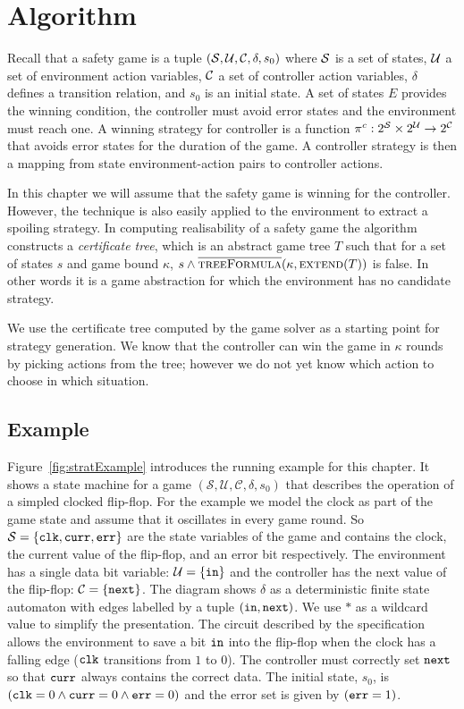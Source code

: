 \section{Algorithm}

Recall that a safety game is a tuple $(\mathcal{S}, \mathcal{U}, \mathcal{C}, \delta, s_0)$ where $\mathcal{S}$ is a set of states, $\mathcal{U}$ a set of environment action variables, $\mathcal{C}$ a set of controller action variables, $\delta$ defines a transition relation, and $s_0$ is an initial state. A set of states $E$ provides the winning condition, the controller must avoid error states and the environment must reach one. A winning strategy for controller is a function $\pi^c : 2^{\mathcal{S}} \times 2^{\mathcal{U}} \to 2^{\mathcal{C}}$ that avoids error states for the duration of the game. A controller strategy is then a mapping from state environment-action pairs to controller actions.

In this chapter we will assume that the safety game is winning for the controller. However, the technique is also easily applied to the environment to extract a spoiling strategy. In computing realisability of a safety game the algorithm constructs a \emph{certificate tree}, which is an abstract game tree $T$ such that for a set of states $s$ and game bound $\kappa$, $s \land \textsc{$\overline{\mbox{treeFormula}}$}(\kappa, \textsc{extend}(T))$ is false. In other words it is a game abstraction for which the environment has no candidate strategy.

We use the certificate tree computed by the game solver as a starting point for strategy generation.  We know that the controller can win the game in $\kappa$ rounds by picking actions from the tree; however we do not yet know which action to choose in which situation.


\subsection{Example}

Figure~\ref{fig:stratExample} introduces the running example for this chapter. It shows a state machine for a game $(\mathcal{S}, \mathcal{U}, \mathcal{C}, \delta, s_0)$ that describes the operation of a simpled clocked flip-flop. For the example we model the clock as part of the game state and assume that it oscillates in every game round. So $\mathcal{S} = \{ \texttt{clk}, \texttt{curr}, \texttt{err} \}$ are the state variables of the game and contains the clock, the current value of the flip-flop, and an error bit respectively. The environment has a single data bit variable: $\mathcal{U} = \{ \texttt{in} \}$ and the controller has the next value of the flip-flop: $\mathcal{C} = \{ \texttt{next} \}$. The diagram shows $\delta$ as a deterministic finite state automaton with edges labelled by a tuple $(\texttt{in}, \texttt{next})$. We use $*$ as a wildcard value to simplify the presentation. The circuit described by the specification allows the environment to save a bit $\texttt{in}$ into the flip-flop when the clock has a falling edge ($\texttt{clk}$ transitions from $1$ to $0$). The controller must correctly set $\texttt{next}$ so that $\texttt{curr}$ always contains the correct data. The initial state, $s_0$, is $(\texttt{clk} = 0 \land \texttt{curr} = 0 \land \texttt{err} = 0)$ and the error set is given by $(\texttt{err} = 1)$.

